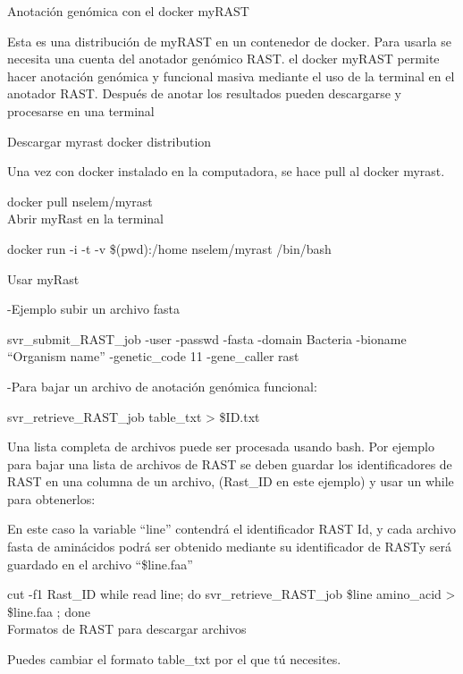 \documentclass[12pt,twoside]{reedthesis}
\begin{document}
  Anotación genómica con el docker myRAST
  
  Esta es una distribución de myRAST en un contenedor de docker. Para
  usarla se necesita una cuenta del anotador genómico RAST. el docker
  myRAST permite hacer anotación genómica y funcional masiva mediante el
  uso de la terminal en el anotador RAST. Después de anotar los resultados
  pueden descargarse y procesarse en una terminal
  
  Descargar myrast docker distribution
  
  Una vez con docker instalado en la computadora, se hace pull al docker
  myrast.
  
  docker pull nselem/myrast\\
  Abrir myRast en la terminal
  
  docker run -i -t -v \$(pwd):/home nselem/myrast /bin/bash
  
  Usar myRast
  
  -Ejemplo subir un archivo fasta
  
  svr\_submit\_RAST\_job -user -passwd -fasta -domain Bacteria -bioname
  ``Organism name'' -genetic\_code 11 -gene\_caller rast
  
  -Para bajar un archivo de anotación genómica funcional:
  
  svr\_retrieve\_RAST\_job table\_txt \textgreater{} \$ID.txt
  
  Una lista completa de archivos puede ser procesada usando bash. Por
  ejemplo para bajar una lista de archivos de RAST se deben guardar los
  identificadores de RAST en una columna de un archivo, (Rast\_ID en este
  ejemplo) y usar un while para obtenerlos:
  
  En este caso la variable ``line'' contendrá el identificador RAST Id, y
  cada archivo fasta de aminácidos podrá ser obtenido mediante su
  identificador de RASTy será guardado en el archivo ``\$line.faa''
  
  cut -f1 Rast\_ID \textbar{} while read line; do svr\_retrieve\_RAST\_job
  \$line amino\_acid \textgreater{} \$line.faa ; done\\
  Formatos de RAST para descargar archivos
  
  Puedes cambiar el formato table\_txt por el que tú necesites.
  
\end{document}
